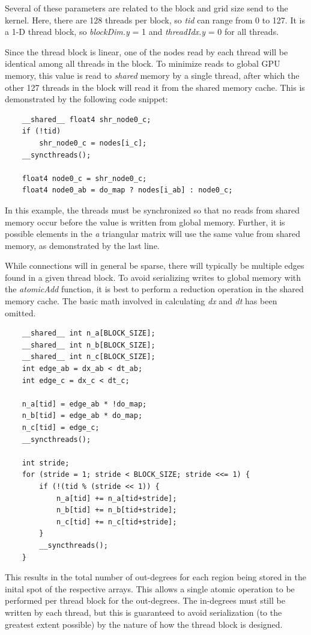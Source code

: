 \documentclass[preprint,notitlepage,amsmath,amssymb,floatfix]{revtex4-1}
\begin{document}
\noindent Several of these parameters are related to the block and grid size send to the kernel.  
Here, there are 128 threads per block, so \textit{tid} can range from 0 to 127.  
It is a 1-D thread block, so \textit{blockDim.y} = 1 and \textit{threadIdx.y} = 0 for all threads. \par
Since the thread block is linear, one of the nodes read by each thread will be identical among all threads in the block.
To minimize reads to global GPU memory, this value is read to \textit{shared} memory by a single thread, after which the other 127 threads in the block will read it from the shared memory cache.
This is demonstrated by the following code snippet:

\begin{lstlisting}
	__shared__ float4 shr_node0_c;
	if (!tid)
		shr_node0_c = nodes[i_c];
	__syncthreads();

	float4 node0_c = shr_node0_c;
	float4 node0_ab = do_map ? nodes[i_ab] : node0_c;
\end{lstlisting}

\noindent In this example, the threads must be synchronized so that no reads from shared memory occur before the value is written from global memory.  
Further, it is possible elements in the \textit{a} triangular matrix will use the same value from shared memory, as demonstrated by the last line. \par
While connections will in general be sparse, there will typically be multiple edges found in a given thread block.  
To avoid serializing writes to global memory with the \textit{atomicAdd} function, it is best to perform a reduction operation in the shared memory cache.  
The basic math involved in calculating \textit{dx} and \textit{dt} has been omitted.

\begin{lstlisting}
	__shared__ int n_a[BLOCK_SIZE];
	__shared__ int n_b[BLOCK_SIZE];
	__shared__ int n_c[BLOCK_SIZE];
	int edge_ab = dx_ab < dt_ab;
	int edge_c = dx_c < dt_c;

	n_a[tid] = edge_ab * !do_map;
	n_b[tid] = edge_ab * do_map;
	n_c[tid] = edge_c;
	__syncthreads();

	int stride;
	for (stride = 1; stride < BLOCK_SIZE; stride <<= 1) {
		if (!(tid % (stride << 1)) {
			n_a[tid] += n_a[tid+stride];
			n_b[tid] += n_b[tid+stride];
			n_c[tid] += n_c[tid+stride];
		}
		__syncthreads();
	}
\end{lstlisting}

\noindent This results in the total number of out-degrees for each region being stored in the inital spot of the respective arrays.  
This allows a single atomic operation to be performed per thread block for the out-degrees.  
The in-degrees must still be written by each thread, but this is guaranteed to avoid serialization (to the greatest extent possible) by the nature of how the thread block is designed.
\end{document}
